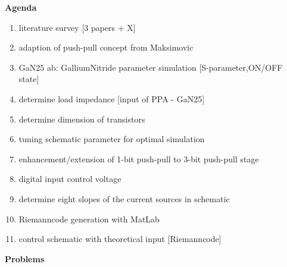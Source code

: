 \textbf{Agenda}
\begin{enumerate}
	\item literature survey [3 papers + X]
	\item adaption of push-pull concept from Maksimovic
	\item GaN25 \gls{ab: GalliumNitride} parameter simulation [S-parameter,ON/OFF state]
	\item determine load impedance [input of PPA - GaN25]
	\item determine dimension of transistors
	\item tuning schematic parameter for optimal simulation
	\item enhancement/extension of 1-bit push-pull to 3-bit push-pull stage
	\item digital input control voltage
	\item determine eight slopes of the current sources in schematic
	\item Riemanncode generation with MatLab
	\item control schematic with theoretical input [Riemanncode]
\end{enumerate}
\vspace{1cm}
\textbf{Problems}
